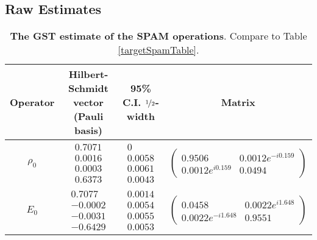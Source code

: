 \documentclass{article}[11pt]
\begin{document}
\FloatBarrier

\subsection{Raw Estimates}

\begin{table}[h]
\begin{center}
\begin{tabular}[l]{|c|c|c|c|}
\hline
Operator & Hilbert-Schmidt vector (Pauli basis) & 95\% C.I. $\nicefrac{1}{2}$-width & Matrix \\ \hline
$\rho_{0}$ & $ \begin{array}{c}
0.7071 \\ 
0.0016 \\ 
0.0003 \\ 
0.6373
 \end{array} $
 & $ \begin{array}{c}
0 \\ 
0.0058 \\ 
0.0061 \\ 
0.0043
 \end{array} $
 & $ \left(\!\!\begin{array}{cc}
0.9506 & 0.0012e^{-i0.159} \\ 
0.0012e^{i0.159} & 0.0494
 \end{array}\!\!\right) $
 \\ \hline
$E_{0}$ & $ \begin{array}{c}
0.7077 \\ 
-0.0002 \\ 
-0.0031 \\ 
-0.6429
 \end{array} $
 & $ \begin{array}{c}
0.0014 \\ 
0.0054 \\ 
0.0055 \\ 
0.0053
 \end{array} $
 & $ \left(\!\!\begin{array}{cc}
0.0458 & 0.0022e^{i1.648} \\ 
0.0022e^{-i1.648} & 0.9551
 \end{array}\!\!\right) $
 \\ \hline
\end{tabular}

\caption{\textbf{The GST estimate of the SPAM operations}.  Compare to Table \ref{targetSpamTable}.\label{bestGatesetSpamTable}}
\end{center}
\end{table}
\end{document}
